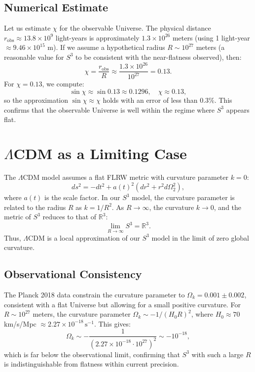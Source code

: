 \documentclass[12pt]{article}
\begin{document}
\subsection{Numerical Estimate}

Let us estimate \(\chi\) for the observable Universe. The physical distance \(r_{\mathrm{obs}} \approx 13.8 \times 10^9\) light-years is approximately \(1.3 \times 10^{26}\) meters (using 1 light-year \(\approx 9.46 \times 10^{15}\) m). If we assume a hypothetical radius \(R \sim 10^{27}\) meters (a reasonable value for \(S^3\) to be consistent with the near-flatness observed), then:
\begin{equation}
 \chi = \frac{r_{\mathrm{obs}}}{R} \approx \frac{1.3 \times 10^{26}}{10^{27}} = 0.13.
\end{equation}
For \(\chi = 0.13\), we compute:
\begin{equation}
 \sin\chi \approx \sin 0.13 \approx 0.1296, \quad \chi \approx 0.13,
\end{equation}
so the approximation \(\sin\chi \approx \chi\) holds with an error of less than 0.3\%. This confirms that the observable Universe is well within the regime where \(S^3\) appears flat.

\section{\(\Lambda\)CDM as a Limiting Case}

The \(\Lambda\)CDM model assumes a flat FLRW metric with curvature parameter \(k = 0\):
\begin{equation}
 ds^2 = -dt^2 + a(t)^2 \left( dr^2 + r^2 d\Omega_2^2 \right),
\end{equation}
where \(a(t)\) is the scale factor. In our \(S^3\) model, the curvature parameter is related to the radius \(R\) as \(k = 1/R^2\). As \(R \to \infty\), the curvature \(k \to 0\), and the metric of \(S^3\) reduces to that of \(\mathbb{R}^3\):
\begin{equation}
 \lim_{R \to \infty} S^3 = \mathbb{R}^3.
\end{equation}
Thus, \(\Lambda\)CDM is a local approximation of our \(S^3\) model in the limit of zero global curvature.

\subsection{Observational Consistency}

The Planck 2018 data constrain the curvature parameter to \(\Omega_k = 0.001 \pm 0.002\), consistent with a flat Universe but allowing for a small positive curvature. For \(R \sim 10^{27}\) meters, the curvature parameter \(\Omega_k \sim -1/(H_0 R)^2\), where \(H_0 \approx 70\) km/s/Mpc \(\approx 2.27 \times 10^{-18}\,\mathrm{s}^{-1}\). This gives:
\begin{equation}
 \Omega_k \sim -\frac{1}{\left(2.27 \times 10^{-18} \cdot 10^{27}\right)^2} \sim -10^{-18},
\end{equation}
which is far below the observational limit, confirming that \(S^3\) with such a large \(R\) is indistinguishable from flatness within current precision.
\end{document}
